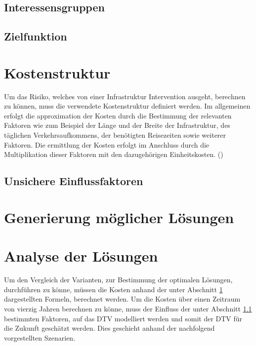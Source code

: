 	\subsection{Interessensgruppen}
	

	\subsection{Zielfunktion}
	
	
\pagebreak

\section{Kostenstruktur}
\label{sec:Kostenstruktur}

Um das Risiko, welches von einer Infrastruktur Intervention ausgeht, berechnen zu können, muss die verwendete Kostenstruktur definiert werden. 
Im allgemeinen erfolgt die approximation der Kosten durch die Bestimmung der relevanten Faktoren wie zum Beispiel der Länge und der Breite der Infrastruktur, des täglichen Verkehrsaufkommens, der benötigten Reisezeiten sowie weiterer Faktoren. Die ermittlung der Kosten erfolgt im Anschluss durch die Multiplikation dieser Faktoren mit den dazugehörigen Einheitskosten. (\cite{Adey2012}) 


	
	
	\subsection{Unsichere Einflussfaktoren}
	\label{subsec:Uncertain}
	



\section{Generierung möglicher Lösungen}
\label{sec:Varianten}



\section{Analyse der Lösungen}
\label{sec:Analyse}

Um den Vergleich der Varianten, zur Bestimmung der optimalen Lösungen, durchführen zu könne, müssen die Kosten anhand der unter Abschnitt \ref{sec:Kostenstruktur} dargestellten Formeln, berechnet werden. Um die Kosten über einen Zeitraum von vierzig Jahren berechnen zu könne, muss der Einfluss der unter Abschnitt \ref{subsec:Uncertain} bestimmten Faktoren, auf das DTV modelliert werden und somit der DTV für die Zukunft geschätzt werden. Dies geschieht anhand der nachfolgend vorgestellten Szenarien.


